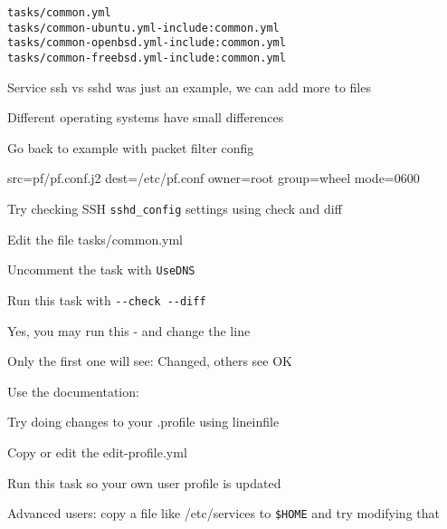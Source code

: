 \documentclass[18pt,landscape,a4paper,footrule]{foils}
\begin{document}


\begin{alltt}
tasks/common.yml
tasks/common-ubuntu.yml - include: common.yml
tasks/common-openbsd.yml - include: common.yml
tasks/common-freebsd.yml - include: common.yml
\end{alltt}

\begin{list2}
\item Service ssh vs sshd was just an example, we can add more to files
\item Different operating systems have small differences
\end{list2}



Go back to example with packet filter config

 src=pf/pf.conf.j2
        dest=/etc/pf.conf owner=root group=wheel mode=0600




Try checking SSH \verb+sshd_config+ settings using check and diff

\begin{list2}
\item Edit the file tasks/common.yml
\item Uncomment the task with \verb+UseDNS+
\item Run this task with \verb+--check --diff+
\item Yes, you may run this - and change the line
\item Only the first one will see: Changed, others see OK
\end{list2}

Use the documentation:\\





Try doing changes to your .profile using lineinfile

\begin{list2}
\item Copy or edit the edit-profile.yml
\item Run this task so your own user profile is updated
\item Advanced users: copy a file like /etc/services to \verb+$HOME+ and try modifying that
\item
\end{list2}
\end{document}
